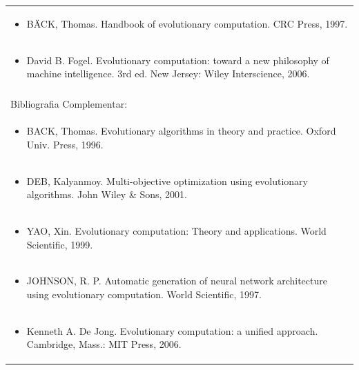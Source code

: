 \documentclass[11pt]{article}
\begin{document}
\begin{center}
\begin{longtable}{|p{4cm}|p{4cm}|p{4cm}|p{4cm}|}
\multicolumn{4}{|p{\dimexpr 16cm + 6\tabcolsep\relax}|}{\begin{itemize}\item BÄCK, Thomas. Handbook of evolutionary computation. CRC Press, 1997.\end{itemize}}\\
\multicolumn{4}{|p{\dimexpr 16cm + 6\tabcolsep\relax}|}{\begin{itemize}\item David B. Fogel. Evolutionary computation: toward a new philosophy of machine intelligence. 3rd ed. New Jersey: Wiley Interscience, 2006.\end{itemize}}\\
\multicolumn{4}{|p{16cm}|}{}\\
\hline
\multicolumn{4}{|p{16cm}|}{Bibliografia Complementar:}\\*
\multicolumn{4}{|p{\dimexpr 16cm + 6\tabcolsep\relax}|}{\begin{itemize}\item BACK, Thomas. Evolutionary algorithms in theory and practice. Oxford Univ. Press, 1996.\end{itemize}}\\
\multicolumn{4}{|p{\dimexpr 16cm + 6\tabcolsep\relax}|}{\begin{itemize}\item DEB, Kalyanmoy. Multi-objective optimization using evolutionary algorithms. John Wiley \& Sons, 2001.\end{itemize}}\\
\multicolumn{4}{|p{\dimexpr 16cm + 6\tabcolsep\relax}|}{\begin{itemize}\item YAO, Xin. Evolutionary computation: Theory and applications. World Scientific, 1999.\end{itemize}}\\
\multicolumn{4}{|p{\dimexpr 16cm + 6\tabcolsep\relax}|}{\begin{itemize}\item JOHNSON, R. P. Automatic generation of neural network architecture using evolutionary computation. World Scientific, 1997.\end{itemize}}\\
\multicolumn{4}{|p{\dimexpr 16cm + 6\tabcolsep\relax}|}{\begin{itemize}\item Kenneth A. De Jong. Evolutionary computation: a unified approach. Cambridge, Mass.: MIT Press, 2006.\end{itemize}}\\
\hline
\end{longtable}
\end{center}
\end{document}
